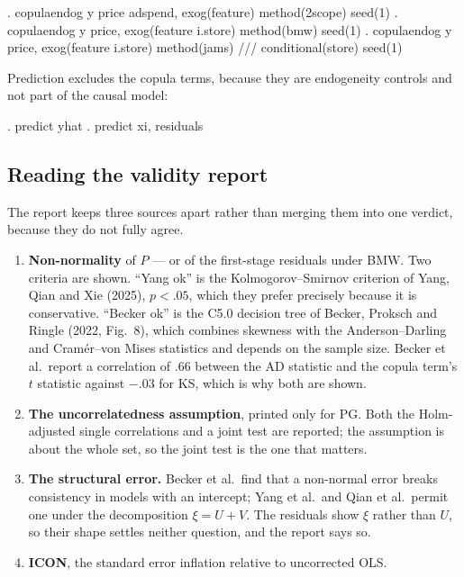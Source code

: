 \documentclass[11pt]{article}
\begin{document}
\begin{stata}
. copulaendog y price adspend, exog(feature) method(2scope) seed(1)
. copulaendog y price, exog(feature i.store) method(bmw) seed(1)
. copulaendog y price, exog(feature i.store) method(jams) ///
      conditional(store) seed(1)
\end{stata}

Prediction excludes the copula terms, because they are endogeneity controls
and not part of the causal model:

\begin{stata}
. predict yhat
. predict xi, residuals
\end{stata}

\subsection{Reading the validity report}

The report keeps three sources apart rather than merging them into one verdict,
because they do not fully agree.

\begin{enumerate}[leftmargin=1.6em,itemsep=0.3em]
\item \textbf{Non-normality} of $P$ --- or of the first-stage residuals under
      BMW. Two criteria are shown. ``Yang ok'' is the Kolmogorov--Smirnov
      criterion of Yang, Qian and Xie (2025), $p < .05$, which they prefer
      precisely because it is conservative. ``Becker ok'' is the C5.0 decision
      tree of Becker, Proksch and Ringle (2022, Fig.~8), which combines
      skewness with the Anderson--Darling and Cram\'er--von Mises statistics
      and depends on the sample size. Becker et al.\ report a correlation of
      $.66$ between the AD statistic and the copula term's $t$ statistic
      against $-.03$ for KS, which is why both are shown.
\item \textbf{The uncorrelatedness assumption}, printed only for PG. Both the
      Holm-adjusted single correlations and a joint test are reported; the
      assumption is about the whole set, so the joint test is the one that
      matters.
\item \textbf{The structural error.} Becker et al.\ find that a non-normal
      error breaks consistency in models with an intercept; Yang et al.\ and
      Qian et al.\ permit one under the decomposition $\xi = U + V$. The
      residuals show $\xi$ rather than $U$, so their shape settles neither
      question, and the report says so.
\item \textbf{ICON}, the standard error inflation relative to uncorrected OLS.
\end{enumerate}
\end{document}
